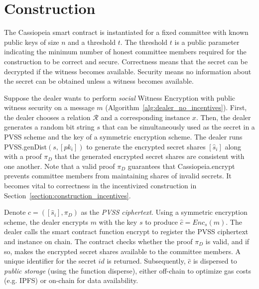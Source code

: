 \section{Construction}\label{section:construction_without_incentives}
The Cassiopeia smart contract is instantiated for a fixed committee with known public keys of size $n$ and a threshold $t$.
The threshold $t$ is a public parameter indicating the minimum number of honest committee members required for the construction to be correct and secure.
Correctness means that the secret can be decrypted if the witness becomes available.
Security means no information about the secret can be obtained unless a witness becomes available.

Suppose the dealer wants to perform \emph{social} Witness Encryption with public witness security on a message $m$ (Algorithm~\ref{alg:dealer_no_incentives}).
First, the dealer chooses a relation $\mathcal{R}$ and a corresponding instance $x$.
Then, the dealer generates a random bit string $s$ that can be simultaneously used as the secret in a PVSS scheme and the key of a symmetric encryption scheme. %
The dealer runs \textsf{PVSS.genDist}$(s, [pk_i])$ to generate the encrypted secret shares $[\hat{s}_i]$ along with a proof $\pi_D$ that the generated encrypted secret shares are consistent with one another.
Note that a valid proof $\pi_D$ guarantees that \textsf{Cassiopeia.encrypt} prevents committee members from maintaining shares of invalid secrets.
It becomes vital to correctness in the incentivized construction in Section~\ref{section:construction_incentives}.

Denote $c = ([\hat{s}_i], \pi_D)$ as the \emph{PVSS ciphertext}.
Using a symmetric encryption scheme, the dealer encrypts $m$ with the key $s$ to produce $\hat{c} = Enc_s(m)$.
The dealer calls the smart contract function \textsf{encrypt} to register the PVSS ciphertext and instance on chain.
The contract checks whether the proof $\pi_D$ is valid, and if so, makes the encrypted secret shares available to the committee members. 
A unique identifier for the secret $id$ is returned.
Subsequently, $\hat{c}$ is dispersed to \emph{public storage} (using the function \textsf{disperse}), either off-chain to optimize gas costs (e.g. IPFS) or on-chain for data availability.

